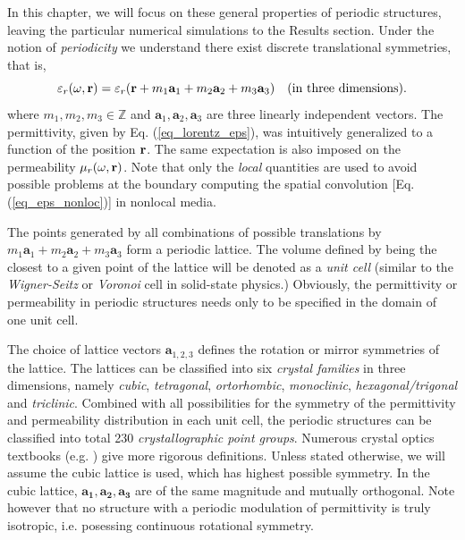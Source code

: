 In this chapter, we will focus on these general properties of periodic structures, leaving the particular numerical simulations to the Results section.
Under the notion of \textit{periodicity} we understand there exist discrete translational symmetries, that is, 
\begin{equation} \varepsilon_r(\omega,{\mathbf{r}}) = \varepsilon_r({\mathbf{r}} + m_1 \mathbf{a}_1 + m_2 \mathbf{a}_2 + m_3 \mathbf{a}_3) \quad\text{(in three dimensions).} \label{eq_trsym}\end{equation}
	where $m_1, m_2, m_3 \in \mathbb{Z}$ and $\mathbf{a}_1, \mathbf{a}_2, \mathbf{a}_3$ are three linearly independent vectors. The permittivity, given by Eq. (\ref{eq_lorentz_eps}), was intuitively generalized to a function of the position ${\mathbf{r}}$. The same expectation is also imposed on the permeability $\mu_r(\omega,{\mathbf{r}})$. Note that only the \textit{local} quantities are used to avoid possible problems at the boundary computing the spatial convolution [Eq. (\ref{eq_eps_nonloc})]  in nonlocal media. 

The points generated by all combinations of possible translations by $m_1 \mathbf{a}_1 + m_2 \mathbf{a}_2 + m_3 \mathbf{a}_3$ form a periodic lattice.
The volume defined by being the closest to a given point of the lattice will be denoted as a \textit{unit cell} (similar to the \textit{Wigner-Seitz} or \textit{Voronoi} cell in solid-state physics.) Obviously, the permittivity or permeability in periodic structures needs only to be specified in the domain of one unit cell.

The choice of lattice vectors $\mathbf{a}_{1,2,3}$ defines the rotation or mirror symmetries of the lattice. The lattices can be classified into six \textit{crystal families} in three dimensions, namely \textit{cubic}, \textit{tetragonal}, \textit{ortorhombic}, \textit{monoclinic}, \textit{hexagonal/trigonal} and \textit{triclinic}. Combined with all possibilities for the symmetry of the permittivity and permeability distribution in each unit cell, the periodic structures can be classified into total 230 \textit{crystallographic point groups}. Numerous crystal optics textbooks (e.g. \cite[p. 678]{born1999book}) give more rigorous definitions. Unless stated otherwise, we will assume the cubic lattice is used, which has highest possible symmetry. In the cubic lattice, $\mathbf{a_1}, \mathbf{a_2}, \mathbf{a_3}$ are of the same magnitude and mutually orthogonal. Note however that no structure with a periodic modulation of permittivity is truly isotropic, i.e. posessing continuous rotational symmetry.

